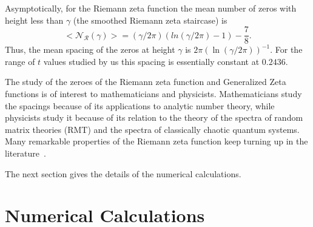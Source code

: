 \documentclass[twoside]{article}
\begin{document}
Asymptotically, for the Riemann zeta function the mean number of 
zeros with height less than $\gamma$ (the smoothed Riemann zeta staircase)
is~\cite{Edwards(1974)}
\begin{equation}  
<\mathcal{N_R} (\gamma)> = (\gamma/2\pi)(ln(\gamma/2\pi)-1)-\frac{7}{8}.
\label{eq:Rnumber}
\end{equation}
Thus, the mean spacing of the zeros at height $\gamma$ is 
$2\pi(\ln (\gamma/2\pi))^{-1}$. For the range of $t$ values
studied by us this spacing is essentially constant at $0.2436$.

The study of the zeroes of the Riemann zeta function and Generalized 
Zeta functions is of interest to mathematicians and physicists. Mathematicians 
study the spacings because of its applications to analytic number theory, 
while physicists study it because of its  relation 
to the theory of the spectra of random matrix theories (RMT) 
and the spectra of classically chaotic quantum systems. 
Many remarkable properties of the Riemann zeta function keep turning up in the literature~\cite{os6,Matiyasevich}.


The next section gives the details of the numerical calculations.

\section{\label{sec3}Numerical Calculations}
\end{document}
